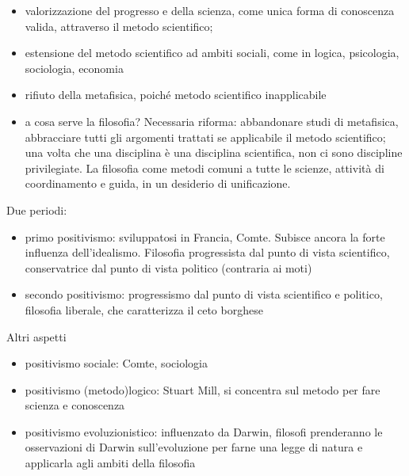 \documentclass[letterpaper,10pt,italian]{jupyterBook}
\begin{document}
\sphinxAtStartPar
{}
\begin{itemize}
\item {} 
\sphinxAtStartPar
valorizzazione del progresso e della scienza, come unica forma di conoscenza valida, attraverso il metodo scientifico;

\item {} 
\sphinxAtStartPar
estensione del metodo scientifico ad ambiti sociali, come in logica, psicologia, sociologia, economia

\item {} 
\sphinxAtStartPar
rifiuto della metafisica, poiché metodo scientifico inapplicabile

\item {} 
\sphinxAtStartPar
a cosa serve la filosofia? Necessaria riforma: abbandonare studi di metafisica, abbracciare tutti gli argomenti trattati se applicabile il metodo scientifico; una volta che una disciplina è una disciplina scientifica, non ci sono discipline privilegiate. La filosofia come metodi comuni a tutte le scienze, attività di coordinamento e guida, in un desiderio di unificazione.

\end{itemize}

\sphinxAtStartPar
Due periodi:
\begin{itemize}
\item {} 
\sphinxAtStartPar
primo positivismo: sviluppatosi in Francia, Comte. Subisce ancora la forte influenza dell’idealismo. Filosofia progressista dal punto di vista scientifico, conservatrice dal punto di vista politico (contraria ai moti)

\item {} 
\sphinxAtStartPar
secondo positivismo: progressismo dal punto di vista scientifico e politico, filosofia liberale, che caratterizza il ceto borghese

\end{itemize}

\sphinxAtStartPar
Altri aspetti
\begin{itemize}
\item {} 
\sphinxAtStartPar
positivismo sociale: Comte, sociologia

\item {} 
\sphinxAtStartPar
positivismo (metodo)logico: Stuart Mill, si concentra sul metodo per fare scienza e conoscenza

\item {} 
\sphinxAtStartPar
positivismo evoluzionistico: influenzato da Darwin, filosofi prenderanno le osservazioni di Darwin sull’evoluzione per farne una legge di natura e applicarla agli ambiti della filosofia

\end{itemize}
\end{document}

